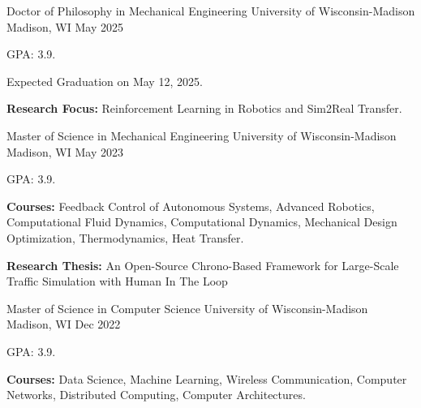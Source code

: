 

\begin{cventries}

  \cventry
    {Doctor of Philosophy in Mechanical Engineering} %
    {University of Wisconsin-Madison} %
    {Madison, WI} %
    {May 2025} %
    {   
    	\begin{cvitems} %
    		\item {GPA: 3.9.}
    		\item {Expected Graduation on May 12, 2025.}
    		\item {\textbf{Research Focus:} Reinforcement Learning in Robotics and Sim2Real Transfer.\\
    		}
    	\end{cvitems} 		
    }

    
  \cventry
    {Master of Science in Mechanical Engineering} %
    {University of Wisconsin-Madison} %
    {Madison, WI} %
    {May 2023} %
    {
        \begin{cvitems} %
    		\item {GPA: 3.9.}
    		\item {\textbf{Courses:} Feedback Control of Autonomous Systems, Advanced Robotics, Computational Fluid Dynamics, Computational Dynamics, Mechanical Design Optimization, Thermodynamics, Heat Transfer.}
    		\item {\textbf{Research Thesis:} An Open-Source Chrono-Based Framework for Large-Scale Traffic Simulation with Human In The Loop \\
    		}
    	\end{cvitems}
    }
    
  \cventry
	{Master of Science in Computer Science} %
	{University of Wisconsin-Madison} %
	{Madison, WI} %
	{Dec 2022} %
	{
	  \begin{cvitems} %
		\item {GPA: 3.9.}
		\item {\textbf{Courses:} Data Science, Machine Learning, Wireless Communication, Computer Networks, Distributed Computing, Computer Architectures.}
	  \end{cvitems}
	}


\end{cventries}
